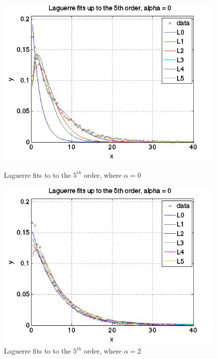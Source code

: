 \documentclass{article}
\begin{document}
\begin{figure}[h]
\centering
	\begin{minipage}[c][][b]{0.45\linewidth}
		\begin{center}
		\includegraphics[scale=0.35]{Matlab/FittingData/Graph/part3,1.png}  
		\end{center}
		\caption[b]{Laguerre fits to to the $5^{th}$ order, where $\alpha = 0$}
		\label{part3,1}
	\end{minipage}
\quad\quad\quad\quad
	\begin{minipage}[c][][b]{0.45\linewidth}
		\begin{center}
		\includegraphics[scale=0.35]{Matlab/FittingData/Graph/part3,2.png}
		\end{center}
		\caption[b]{Laguerre fits to to the $5^{th}$ order, where $\alpha = 2$}
		\label{part3,2}
	\end{minipage}

\end{figure}
\end{document}
